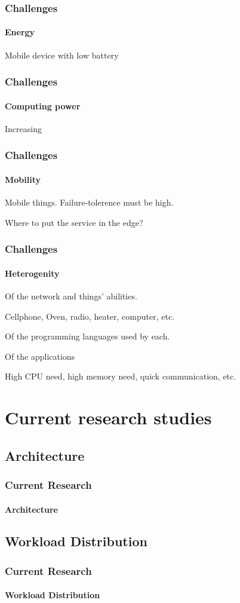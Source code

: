 \documentclass[utf8,xcolor=table, page number]{earlywinter}
\begin{document}
\begin{frame}
  \frametitle{Challenges}
  \framesubtitle{Energy}
  
  Mobile device with low battery
  
\end{frame}
\begin{frame}
  \frametitle{Challenges}
  \framesubtitle{Computing power}
  
  Increasing
  
\end{frame}
\begin{frame}
  \frametitle{Challenges}
  \framesubtitle{Mobility}
  
  Mobile things. Failure-tolerence must be high.
  
  Where to put the service in the edge?
  
\end{frame}
\begin{frame}
  \frametitle{Challenges}
  \framesubtitle{Heterogenity}
  
  Of the network and things' abilities.
  
	\begin{example}
		Cellphone, Oven, radio, heater, computer, etc.
	\end{example}
  
  Of the programming languages used by each.  
  
  Of the applications
	\begin{example}
		High CPU need, high memory need, quick communication, etc.
	\end{example}
  
\end{frame}

\section{Current research studies}
\subsection{Architecture}
\begin{frame}
  \frametitle{Current Research}
  \framesubtitle{Architecture}
\end{frame}
\subsection{Workload Distribution}
\begin{frame}
  \frametitle{Current Research}
  \framesubtitle{Workload Distribution}
\end{frame}
\end{document}
